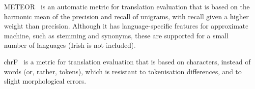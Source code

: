 METEOR~\citep{denkowski2014meteor} is an automatic metric for translation evaluation that is based on the
harmonic mean of the precision and recall of unigrams, with recall given a higher weight than precision.
Although it has language-specific features for approximate machine, such as stemming and synonyms, these
are supported for a small number of languages (Irish is not included).

chrF~\citep{popovic2015chrf} is a metric for translation evaluation that is based on characters, instead of
words (or, rather, tokens), which is resistant to tokenisation differences, and to slight morphological
errors.


